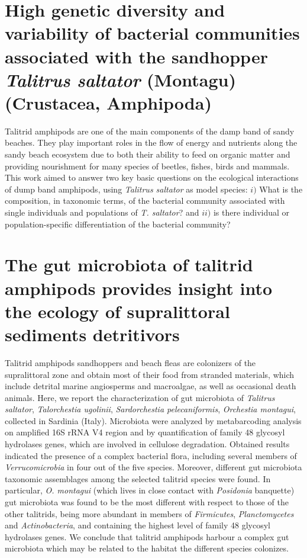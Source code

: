 \section{High genetic diversity and variability of bacterial communities associated with the sandhopper \textit{Talitrus saltator} (Montagu) (Crustacea, Amphipoda)}
Talitrid amphipods are one of the main components of the damp band of sandy beaches. They play important roles in the flow of energy and nutrients along the sandy beach ecosystem due to both their ability to feed on organic matter and providing nourishment for many species of beetles, fishes, birds and mammals. This work aimed to answer two key basic questions on the ecological interactions of dump band amphipods, using \textit{Talitrus saltator} as model species: $i)$ What is the composition, in taxonomic terms, of the bacterial community associated with single individuals and populations of \textit{T. saltator}? and $ii)$ is there individual or population-specific differentiation of the bacterial community?\\

\newpage

\newpage


\section{The gut microbiota of talitrid amphipods provides insight into the ecology of supralittoral sediments detritivors}
Talitrid amphipods sandhoppers and beach fleas are colonizers of the supralittoral zone and obtain most of their food from stranded materials, which include detrital marine angiosperms and macroalgae, as well as occasional death animals. Here, we report the characterization of gut microbiota of \textit{Talitrus saltator}, \textit{Talorchestia ugolinii}, \textit{Sardorchestia pelecaniformis}, \textit{Orchestia montagui}, collected in Sardinia (Italy). Microbiota were analyzed by metabarcoding analysis on amplified 16S rRNA V4 region and by quantification of family 48 glycosyl hydrolases genes, which are involved in cellulose degradation. Obtained results indicated the presence of a complex bacterial flora, including several members of \textit{Verrucomicrobia} in four out of the five species. Moreover, different gut microbiota taxonomic assemblages among the selected talitrid species were found. In particular, \textit{O. montagui} (which lives in close contact with \textit{Posidonia} banquette) gut microbiota was found to be the most different with respect to those of the other talitrids, being more abundant in members of \textit{Firmicutes}, \textit{Planctomycetes} and \textit{Actinobacteria}, and containing the highest level of family 48 glycosyl hydrolases genes. We conclude that talitrid amphipods harbour a complex gut microbiota which may be related to the habitat the different species colonizes.\\

